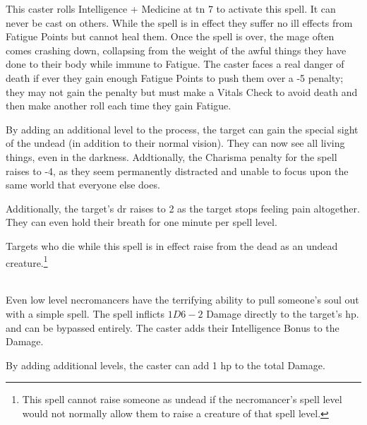 \begin{multicols}{2}
This caster rolls Intelligence + Medicine at \gls{tn} 7 to activate this spell. It can never be cast on others. While the spell is in effect they suffer no ill effects from Fatigue Points but cannot heal them. Once the spell is over, the mage often comes crashing down, collapsing from the weight of the awful things they have done to their body while immune to Fatigue. The caster faces a real danger of death if ever they gain enough Fatigue Points to push them over a -5 penalty; they may not gain the penalty but must make a Vitals Check to avoid death and then make another roll each time they gain Fatigue.


By adding an additional level to the process, the target can gain the special sight of the undead (in addition to their normal vision).
They can now see all living things, even in the darkness.
Addtionally, the Charisma penalty for the spell raises to -4, as they seem permanently distracted and unable to focus upon the same world that everyone else does.

Additionally, the target's \gls{dr} raises to 2 as the target stops feeling pain altogether.  They can even hold their breath for one minute per spell level.

Targets who die while this spell is in effect raise from the dead as an undead creature.\footnote{This spell cannot raise someone as undead if the necromancer's spell level would not normally allow them to raise a creature of that spell level.}

\spelllevel

\\
Even low level necromancers have the terrifying ability to pull someone's soul out with a simple spell.  The spell inflicts $1D6-2$ Damage directly to the target's \gls{hp}.   and  can be bypassed entirely.  The caster adds their Intelligence Bonus to the Damage.


By adding additional levels, the caster can add 1 \gls{hp} to the total Damage.

\end{multicols}


